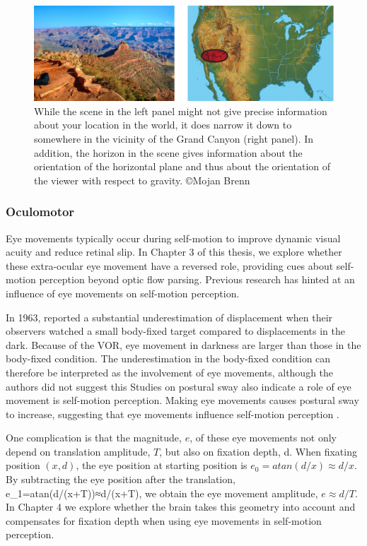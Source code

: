 \begin{figure}
    \includegraphics[width=1.0\textwidth]{src/intro/figures/Canyon.pdf}

    \caption{While the scene in the left panel might not give precise information about your location in the world, it does narrow it down to somewhere in the vicinity of the Grand Canyon (right panel). In addition, the horizon in the scene gives information about the orientation of the horizontal plane and thus about the orientation of the viewer with respect to gravity. \copyright Mojan Brenn}
    \label{intro:fig1}
\end{figure}


\subsubsection{Oculomotor}
Eye movements typically occur during self-motion to improve dynamic visual acuity and reduce retinal slip. In Chapter 3 of this thesis, we explore whether these extra-ocular eye movement have a reversed role, providing cues about self-motion perception beyond optic flow parsing. Previous research has hinted at an influence of eye movements on self-motion perception.

In 1963, \citeauthor{guedry1963} reported a substantial underestimation of displacement when their observers watched a small body-fixed target compared to displacements in the dark. Because of the VOR, eye movement in darkness are larger than those in the body-fixed condition. The underestimation in the body-fixed condition can therefore be interpreted as the involvement of eye movements, although the authors did not suggest this 
Studies on postural sway also indicate a role of eye movement is self-motion perception. Making eye movements causes postural sway to increase, suggesting that eye movements influence self-motion perception \cite{glasauer2005,rogrigues2015}.

One complication is that the magnitude, $e$, of these eye movements not only depend on translation amplitude, $T$, but also on fixation depth, d. When fixating position $(x, d)$, the eye position at starting position is $e_0 = atan⁡(d/x) \approx d/x$. By subtracting the eye position after the translation, e_1=atan⁡(d/(x+T))≈d/(x+T), we obtain the eye movement amplitude, $e \approx d/T$. In Chapter 4 we explore whether the brain takes this geometry into account and compensates for fixation depth when using eye movements in self-motion perception.


